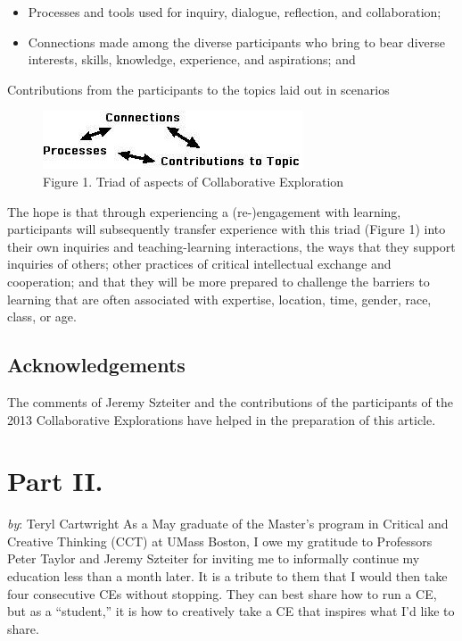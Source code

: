 \begin{itemize}
\item
  Processes and tools used for inquiry, dialogue, reflection, and
  collaboration;
\item
  Connections made among the diverse participants who bring to bear
  diverse interests, skills, knowledge, experience, and aspirations; and
\end{itemize}
Contributions from the participants to the topics laid out in scenarios

\begin{figure}[htbp]
\centering
\includegraphics{../pictures/ce.jpg}
\caption*{Figure 1.  Triad of aspects of Collaborative Exploration}
\end{figure}

The hope is that through experiencing a (re-)engagement with learning,
participants will subsequently transfer experience with this triad
(Figure 1) into their own inquiries and teaching-learning
interactions, the ways that they support inquiries of others; other
practices of critical intellectual exchange and cooperation; and that
they will be more prepared to challenge the barriers to learning that
are often associated with expertise, location, time, gender, race,
class, or age.

\subsection{Acknowledgements}

The comments of Jeremy Szteiter and the contributions of the
participants of the 2013 Collaborative Explorations have helped in the
preparation of this article.

\section*{Part II.}

\emph{by}: Teryl Cartwright As a May graduate of the Master's program in
Critical and Creative Thinking (CCT) at UMass Boston, I owe my gratitude
to Professors Peter Taylor and Jeremy Szteiter for inviting me to
informally continue my education less than a month later. It is a
tribute to them that I would then take four consecutive CEs without
stopping. They can best share how to run a CE, but as a ``student,'' it
is how to creatively take a CE that inspires what I'd like to share.

